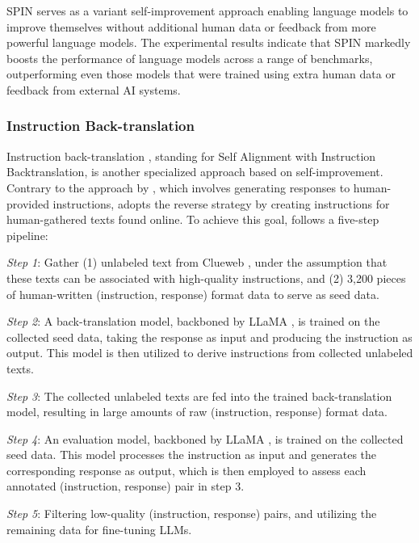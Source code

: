 \documentclass[11pt]{article}
\begin{document}
SPIN \cite{chen2024self} serves as a variant self-improvement approach enabling language models to improve themselves without additional human data or feedback from more powerful language models. The experimental results indicate that SPIN \cite{chen2024self} markedly boosts the performance of language models across a range of benchmarks, outperforming even those models that were trained using extra human data or feedback from external AI systems.

\subsubsection{Instruction Back-translation}

Instruction back-translation \cite{li2023self}, standing for Self Alignment with Instruction Backtranslation, is another specialized approach based on self-improvement. Contrary to the approach by \citet{wang2022self}, which involves generating responses to human-provided instructions, \citet{li2023self} adopts the reverse strategy by creating instructions for human-gathered texts found online. To achieve this goal, \citet{li2023self} follows a five-step pipeline:

 \textit{Step 1}: Gather (1) unlabeled text from Clueweb \cite{overwijk2022clueweb22}, under the assumption that these texts can be associated with high-quality instructions, and (2) 3,200 pieces of human-written (instruction, response) format data to serve as seed data.
 
 \textit{Step 2}: A back-translation model, backboned by LLaMA \cite{touvron2023llama}, is trained on the collected seed data, taking the response as input and producing the instruction as output. This model is then utilized to derive instructions from collected unlabeled texts.
 
 \textit{Step 3}: The collected unlabeled texts are fed into the trained back-translation model, resulting in large amounts of raw (instruction, response) format data.
 
 \textit{Step 4}: An evaluation model, backboned by LLaMA \cite{touvron2023llama}, is trained on the collected seed data. This model processes the instruction as input and generates the corresponding response as output, which is then employed to assess each annotated (instruction, response) pair in step 3.
  
 \textit{Step 5}: Filtering low-quality (instruction, response) pairs, and utilizing the remaining data for fine-tuning LLMs.
 
\end{document}
